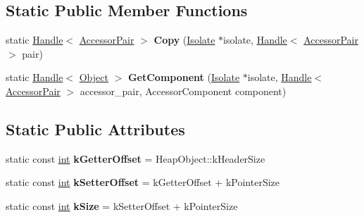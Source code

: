 \subsection*{Static Public Member Functions}
\begin{DoxyCompactItemize}
\item 
\mbox{\label{classv8_1_1internal_1_1AccessorPair_a9f5c37f34a6087031558a7642ea2753b}} 
static \mbox{\hyperlink{classv8_1_1internal_1_1Handle}{Handle}}$<$ \mbox{\hyperlink{classv8_1_1internal_1_1AccessorPair}{Accessor\+Pair}} $>$ {\bfseries Copy} (\mbox{\hyperlink{classv8_1_1internal_1_1Isolate}{Isolate}} $\ast$isolate, \mbox{\hyperlink{classv8_1_1internal_1_1Handle}{Handle}}$<$ \mbox{\hyperlink{classv8_1_1internal_1_1AccessorPair}{Accessor\+Pair}} $>$ pair)
\item 
\mbox{\label{classv8_1_1internal_1_1AccessorPair_aa6a6d7bece4c45ec21d798e0c6c910b7}} 
static \mbox{\hyperlink{classv8_1_1internal_1_1Handle}{Handle}}$<$ \mbox{\hyperlink{classv8_1_1internal_1_1Object}{Object}} $>$ {\bfseries Get\+Component} (\mbox{\hyperlink{classv8_1_1internal_1_1Isolate}{Isolate}} $\ast$isolate, \mbox{\hyperlink{classv8_1_1internal_1_1Handle}{Handle}}$<$ \mbox{\hyperlink{classv8_1_1internal_1_1AccessorPair}{Accessor\+Pair}} $>$ accessor\+\_\+pair, Accessor\+Component component)
\end{DoxyCompactItemize}
\subsection*{Static Public Attributes}
\begin{DoxyCompactItemize}
\item 
\mbox{\label{classv8_1_1internal_1_1AccessorPair_aa7ee07b7098a35f0e1340c33dadb90db}} 
static const \mbox{\hyperlink{classint}{int}} {\bfseries k\+Getter\+Offset} = Heap\+Object\+::k\+Header\+Size
\item 
\mbox{\label{classv8_1_1internal_1_1AccessorPair_adaca2d4fb0dfcf2e29fd37fc5549737b}} 
static const \mbox{\hyperlink{classint}{int}} {\bfseries k\+Setter\+Offset} = k\+Getter\+Offset + k\+Pointer\+Size
\item 
\mbox{\label{classv8_1_1internal_1_1AccessorPair_a89c0268865b5203f29820f82b5e46cb5}} 
static const \mbox{\hyperlink{classint}{int}} {\bfseries k\+Size} = k\+Setter\+Offset + k\+Pointer\+Size
\end{DoxyCompactItemize}
